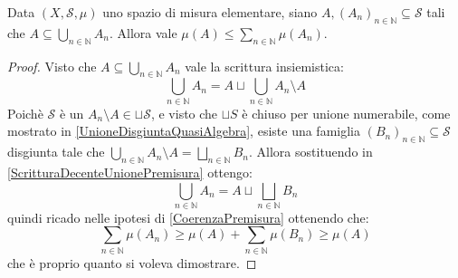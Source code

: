 \begin{lemma}\label{PiuCheMonotonaPremisura}
	Data $(X,\mathcal S,\mu)$ uno spazio di misura elementare, siano $A,(A_n)_{n\in\mathbb N}\subseteq \mathcal S$ tali che $A\subseteq\bigcup_{n\in\mathbb N}A_n$.
	Allora vale $\mu(A)\le \sum_{n\in\mathbb N}\mu(A_n)$.
\end{lemma}
\begin{proof}
	Visto che $A\subseteq\bigcup_{n\in\mathbb N}A_n$ vale la scrittura insiemistica:
	\begin{equation}\label{ScritturaDecenteUnionePremisura}
		\bigcup_{n\in\mathbb N}A_n=A\sqcup\bigcup_{n\in\mathbb N}A_n\setminus A
	\end{equation}
	Poichè $\mathcal S$ è un \semiring{} $A_n\setminus A\in \sqcup \mathcal S$, e visto che $\sqcup S$ è chiuso per unione numerabile, come mostrato in \cref{UnioneDisgiuntaQuasiAlgebra}, esiste una famiglia $(B_n)_{n\in\mathbb N}\subseteq\mathcal S$ disgiunta tale che $\bigcup_{n\in\mathbb N}A_n\setminus A=\bigsqcup_{n\in\mathbb N}B_n$.
	Allora sostituendo in \cref{ScritturaDecenteUnionePremisura} ottengo:
	\begin{equation*}
		\bigcup_{n\in\mathbb N}A_n=A\sqcup\bigsqcup_{n\in\mathbb N}B_n
	\end{equation*}
	quindi ricado nelle ipotesi di \cref{CoerenzaPremisura} ottenendo che:
	\begin{equation*}
		\sum_{n\in\mathbb N}\mu(A_n)\ge \mu(A)+\sum_{n\in\mathbb N}\mu(B_n)\ge \mu(A)
	\end{equation*}
	che è proprio quanto si voleva dimostrare.

\end{proof}


